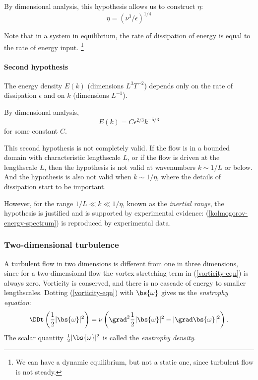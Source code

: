 By dimensional analysis, this hypothesis allows us to construct $\eta$:
\begin{equation}
    \eta = (\nu^3 / \epsilon)^{1/4}
\end{equation}

Note that in a system in equilibrium, the rate of dissipation of energy is
equal to the rate of energy input.
\footnote{We can have a dynamic equilibrium, but not a static one, since
turbulent flow is not steady.}

\paragraph{Second hypothesis} The energy density $E(k)$ (dimensions $L^3
T^{-2}$) depends only on the rate of dissipation $\epsilon$ and on $k$
(dimensions $L^{-1}$).

By dimensional analysis,
\begin{equation}
    E(k) = C \epsilon^{2/3} k^{-5/3}
    \label{kolmogorov-energy-spectrum}
\end{equation}
for some constant $C$.

This second hypothesis is not completely valid. If the flow is in a bounded
domain with characteristic lengthscale $L$, or if the flow is driven at the
lengthscale $L$, then the hypothesis is not valid at wavenumbers $k\sim1/L$ or
below. And the hypothesis is also not valid when $k\sim1/\eta$, where the
details of dissipation start to be important.

However, for the range $1/L\ll k\ll 1/\eta$, known as the \textit{inertial
range}, the hypothesis is justified and is supported by experimental evidence:
(\ref{kolmogorov-energy-spectrum}) is reproduced by experimental data. 

\subsubsection{Two-dimensional turbulence}

A turbulent flow in two dimensions is different from one in three dimensions,
since for a two-dimensional flow the vortex stretching term in
(\ref{vorticity-eqn}) is always zero. Vorticity is conserved, and there is no
cascade of energy to smaller lengthscales. Dotting (\ref{vorticity-eqn}) with
$\bs{\omega}$ gives us the \textit{enstrophy equation}:
\begin{equation}
    \DDt\left(\frac{1}{2}|\bs{\omega}|^2\right) 
    = \nu\left(\grad^2\frac{1}{2}|\bs{\omega}|^2 - |\grad\bs{\omega}|^2\right).
 \label{enstrophy-eqn}
\end{equation}
The scalar quantity $\frac{1}{2}|\bs{\omega}|^2$ is called the
\textit{enstrophy density}. 

